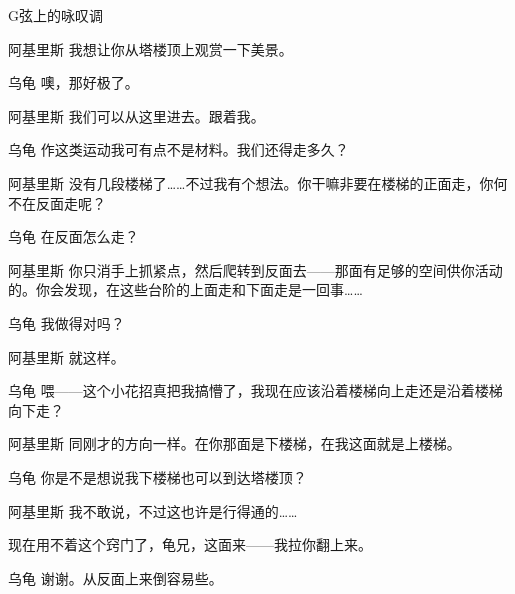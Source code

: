 \begin{dialog}{G弦上的咏叹调}
\begin{dialogue}
\item[阿基里斯]我想让你从塔楼顶上观赏一下美景。

\item[乌龟]噢，那好极了。


\item[阿基里斯]我们可以从这里进去。跟着我。


\item[乌龟]作这类运动我可有点不是材料。我们还得走多久？

\item[阿基里斯]没有几段楼梯了……不过我有个想法。你干嘛非要在楼梯的正面走，你何不在反面走呢？

\item[乌龟]在反面怎么走？

\item[阿基里斯]你只消手上抓紧点，然后爬转到反面去——那面有足够的空间供你活动的。你会发现，在这些台阶的上面走和下面走是一回事……

\item[乌龟]我做得对吗？

\item[阿基里斯]就这样。

\item[乌龟]喂——这个小花招真把我搞懵了，我现在应该沿着楼梯向上走还是沿着楼梯向下走？

\item[阿基里斯]同刚才的方向一样。在你那面是下楼梯，在我这面就是上楼梯。

\item[乌龟]你是不是想说我下楼梯也可以到达塔楼顶？

\item[阿基里斯]我不敢说，不过这也许是行得通的……


现在用不着这个窍门了，龟兄，这面来——我拉你翻上来。


\item[乌龟]谢谢。从反面上来倒容易些。


\end{dialogue}
\end{dialog}
